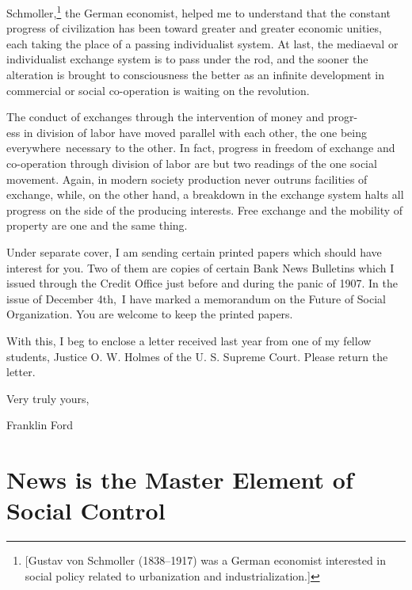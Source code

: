 \documentclass[twoside,symmetric,nobib,justified]{tufte-book}
\let\oldchapter\chapter
\def\chapter{%
  \setcounter{footnote}{0}%
  \oldchapter
}
\begin{document}
Schmoller,\footnote{{[}Gustav von Schmoller (1838--1917) was a German
  economist interested in social policy related to urbanization and
  industrialization.{]}} the German economist, helped me to understand
that the constant progress of civilization has been toward greater and
greater economic unities, each taking the place of a passing
individualist system. At last, the mediaeval or individualist exchange
system is to pass under the rod, and the sooner the alteration is
brought to consciousness the better as an infinite development in
commercial or social co-operation is waiting on the revolution.~

The conduct of exchanges through the intervention of money and progr-\\\noindent ess
in division of labor have moved parallel with each other, the one being
everywhere~necessary to the other. In fact, progress in freedom of
exchange and co-operation through division of labor are but two readings
of the one social movement. Again, in modern society production never
outruns facilities of exchange, while, on the other hand, a breakdown in
the exchange system halts all progress on the side of the producing
interests. Free exchange and the mobility of property are one and the
same thing.~

Under separate cover, I am sending certain printed papers which should
have interest for you. Two of them are copies of certain Bank News
Bulletins which I issued through the Credit Office just before and
during the panic of 1907. In the issue of December 4th,~I have marked a
memorandum on the Future of Social Organization. You are welcome to keep
the printed papers.~

\newpage With this, I beg to enclose a letter received last year from one of my
fellow students, Justice O. W. Holmes of the U. S. Supreme Court. Please
return the letter.

\vspace{0.2in}

\begin{center}
    
{\large Very truly yours,}

\vspace{0.1in}

\hspace{0.3in} {\large Franklin Ford}

\end{center}

\chapter[News is the Master Element of Social Control]{News is the Master Element of Social Control}
\label{ch:News is the Master Element of Social Control}
\end{document}
